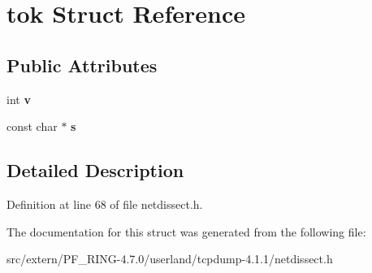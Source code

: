 \hypertarget{structtok}{
\section{tok Struct Reference}
\label{structtok}
}
\subsection*{Public Attributes}
\begin{DoxyCompactItemize}
\item 
\hypertarget{structtok_aa3e680781945f84d6902f80249897d62}{
int {\bfseries v}}
\label{structtok_aa3e680781945f84d6902f80249897d62}

\item 
\hypertarget{structtok_ac4b99255b4b5b66e91d6bcc492425a1c}{
const char $\ast$ {\bfseries s}}
\label{structtok_ac4b99255b4b5b66e91d6bcc492425a1c}

\end{DoxyCompactItemize}


\subsection{Detailed Description}


Definition at line 68 of file netdissect.h.



The documentation for this struct was generated from the following file:\begin{DoxyCompactItemize}
\item 
src/extern/PF\_\-RING-\/4.7.0/userland/tcpdump-\/4.1.1/netdissect.h\end{DoxyCompactItemize}
